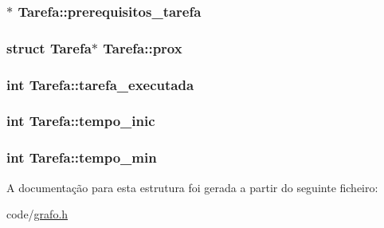 \hypertarget{structTarefa_abdbaac144f089e939832a4d6cbf0759a}{
\subsubsection[{prerequisitos\-\_\-tarefa}]{$\ast$ Tarefa\-::prerequisitos\-\_\-tarefa}}\label{structTarefa_abdbaac144f089e939832a4d6cbf0759a}
\hypertarget{structTarefa_a1b0bbf147698174596c486d12afa254e}{
\subsubsection[{prox}]{\setlength{\rightskip}{0pt plus 5cm}struct {\bf Tarefa}$\ast$ Tarefa\-::prox}}\label{structTarefa_a1b0bbf147698174596c486d12afa254e}
\hypertarget{structTarefa_a86ef331b855e3f91eec492a00171cc9c}{
\subsubsection[{tarefa\-\_\-executada}]{\setlength{\rightskip}{0pt plus 5cm}int Tarefa\-::tarefa\-\_\-executada}}\label{structTarefa_a86ef331b855e3f91eec492a00171cc9c}
\hypertarget{structTarefa_a202a3c8fbee0bf74488fa057587f13df}{
\subsubsection[{tempo\-\_\-inic}]{\setlength{\rightskip}{0pt plus 5cm}int Tarefa\-::tempo\-\_\-inic}}\label{structTarefa_a202a3c8fbee0bf74488fa057587f13df}
\hypertarget{structTarefa_a4fd1b4c3fd98a3fb754116f6cc80c906}{
\subsubsection[{tempo\-\_\-min}]{\setlength{\rightskip}{0pt plus 5cm}int Tarefa\-::tempo\-\_\-min}}\label{structTarefa_a4fd1b4c3fd98a3fb754116f6cc80c906}


A documentação para esta estrutura foi gerada a partir do seguinte ficheiro\-:\begin{DoxyCompactItemize}
\item 
code/\hyperlink{grafo_8h}{grafo.\-h}\end{DoxyCompactItemize}
